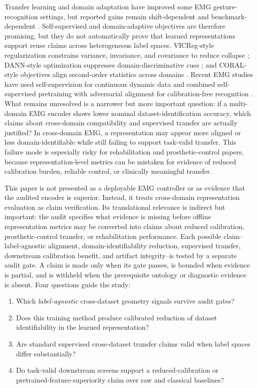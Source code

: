 \documentclass[journal]{IEEEtran}
\begin{document}
Transfer learning and domain adaptation have improved some EMG gesture-recognition settings, but reported gains remain shift-dependent and benchmark-dependent \cite{coteallard2019transfer,yang2024emgbench,raghu2025vicregemg,yang2025calibrationfree}. Self-supervised and domain-adaptive objectives are therefore promising, but they do not automatically prove that learned representations support reuse claims across heterogeneous label spaces. VICReg-style regularization constrains variance, invariance, and covariance to reduce collapse \cite{bardes2022vicreg}; DANN-style optimization suppresses domain-discriminative cues \cite{ganin2016dann}; and CORAL-style objectives align second-order statistics across domains \cite{sun2016deepcoral}. Recent EMG studies have used self-supervision for continuous dynamic data \cite{raghu2025vicregemg} and combined self-supervised pretraining with adversarial alignment for calibration-free recognition \cite{yang2025calibrationfree}. What remains unresolved is a narrower but more important question: if a multi-domain EMG encoder shows lower nominal dataset-identification accuracy, which claims about cross-domain compatibility and supervised transfer are actually justified? In cross-domain EMG, a representation may appear more aligned or less domain-identifiable while still failing to support task-valid transfer. This failure mode is especially risky for rehabilitation and prosthetic-control papers, because representation-level metrics can be mistaken for evidence of reduced calibration burden, reliable control, or clinically meaningful transfer.

This paper is not presented as a deployable EMG controller or as evidence that the audited encoder is superior. Instead, it treats cross-domain representation evaluation as claim verification. Its translational relevance is indirect but important: the audit specifies what evidence is missing before offline representation metrics may be converted into claims about reduced calibration, prosthetic-control transfer, or rehabilitation performance. Each possible claim--label-agnostic alignment, domain-identifiability reduction, supervised transfer, downstream calibration benefit, and artifact integrity--is tested by a separate audit gate. A claim is made only when its gate passes, is bounded when evidence is partial, and is withheld when the prerequisite ontology or diagnostic evidence is absent. Four questions guide the study:
\begin{enumerate}[leftmargin=1.5em]
    \item Which \emph{label-agnostic} cross-dataset geometry signals survive audit gates?
    \item Does this training method produce calibrated reduction of dataset identifiability in the learned representation?
    \item Are standard supervised cross-dataset transfer claims valid when label spaces differ substantially?
    \item Do task-valid downstream screens support a reduced-calibration or pretrained-feature-superiority claim over raw and classical baselines?
\end{enumerate}
\end{document}
